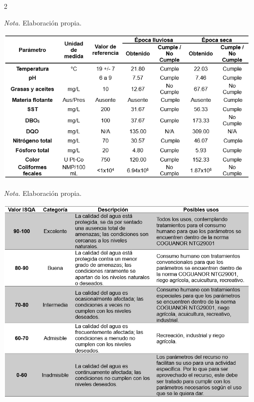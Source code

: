 \documentclass[12pt,spanish,Letterpaper,openany]{book}
\begin{document}
\begin {multicols}{2}
\begin {flushleft}
\begin{minipage}[c]{\columnwidth}
\emph{Nota.} Elaboración propia.

\end{minipage}
\end {flushleft}

\begin {flushleft}
\noindent\begin{minipage}[c]{\columnwidth}

\textbf{}

\begin{center}\includegraphics[width=1\linewidth]{imagenes_articulos/art06_03} \end{center}

\emph{Nota.} Elaboración propia.

\end{minipage}
\end {flushleft}

\begin {flushleft}
\noindent\begin{minipage}[c]{\columnwidth}

\textbf{}

\begin{center}\includegraphics[width=1\linewidth]{imagenes_articulos/art06_04} \end{center}


\end{minipage}
\end{flushleft}
\end{multicols}
\end{document}
